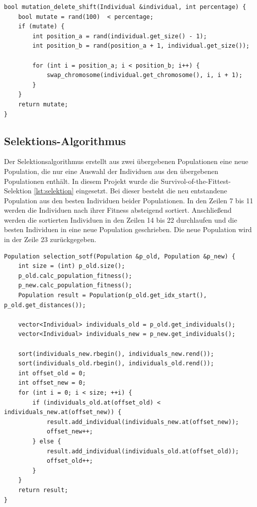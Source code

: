 \begin{minipage}{\linewidth}
\begin{lstlisting}[caption={Delete-Shift-Mutaions-Algorithmus}, firstnumber=1, captionpos=b, label=lst:mutation]
bool mutation_delete_shift(Individual &individual, int percentage) {
	bool mutate = rand(100)  < percentage;
	if (mutate) {
		int position_a = rand(individual.get_size() - 1);
		int position_b = rand(position_a + 1, individual.get_size());
 
		for (int i = position_a; i < position_b; i++) {
			swap_chromosome(individual.get_chromosome(), i, i + 1);
		}
	}
	return mutate;
}
\end{lstlisting}
\end{minipage}
\subsection{Selektions-Algorithmus}
Der Selektionsalgorithmus erstellt aus zwei übergebenen Populationen eine neue Population, die nur eine Auswahl der Individuen aus den übergebenen Populationen enthält.
In diesem Projekt wurde die Survivol-of-the-Fittest-Selektion \ref{lst:selektion} eingesetzt. Bei dieser besteht die neu entstandene Population aus den besten Individuen beider Populationen.
In den Zeilen 7 bis 11 werden die Individuen nach ihrer Fitness absteigend sortiert. Anschließend werden die sortierten Individuen in den Zeilen 14 bis 22 durchlaufen und die besten Individuen in eine neue Population geschrieben. Die neue Population wird in der Zeile 23 zurückgegeben.

\begin{minipage}{\linewidth}
\begin{lstlisting}[caption={Survival-Of-The-Fittest-Selektions-Algorithmus}, firstnumber=1, captionpos=b, label=lst:selektion]
Population selection_sotf(Population &p_old, Population &p_new) {
	int size = (int) p_old.size();
	p_old.calc_population_fitness();
	p_new.calc_population_fitness();
	Population result = Population(p_old.get_idx_start(), p_old.get_distances());

	vector<Individual> individuals_old = p_old.get_individuals();
	vector<Individual> individuals_new = p_new.get_individuals();

	sort(individuals_new.rbegin(), individuals_new.rend());
	sort(individuals_old.rbegin(), individuals_old.rend());
	int offset_old = 0;
	int offset_new = 0;
	for (int i = 0; i < size; ++i) {
		if (individuals_old.at(offset_old) < individuals_new.at(offset_new)) {
			result.add_individual(individuals_new.at(offset_new));
			offset_new++;
		} else {
			result.add_individual(individuals_old.at(offset_old));
 			offset_old++;
		}
	}
	return result;
}
\end{lstlisting}
\end{minipage}
